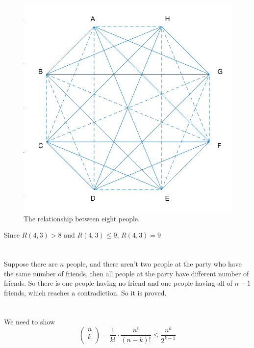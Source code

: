 \documentclass{article}
\begin{document}
\begin{enumerate}[i)]
\begin{figure}[H]
	\centering
	\includegraphics[scale=0.4]{e1_7.png}
	\caption{The relationship between eight people.}
	\label{e1_7}
\end{figure}

Since $R(4,3)>8$ and $R(4,3)\leqslant 9$, $R(4,3)=9$

\end{enumerate}

\section{}
Suppose there are $n$ people, and there aren't two people at the party who have the same number of friends, then all people at the party have different number of friends. So there is one people having no friend and one people having all of $n-1$ friends, which reaches a contradiction. So it is proved.

\section{}
We need to show
\begin{equation*}
\left(\begin{array}{l}n\\k\\\end{array}\right)
=\frac{1}{k!}\cdot\frac{n!}{(n-k)!}\leqslant\frac{n^k}{2^{k-1}}
\end{equation*}
\end{document}
